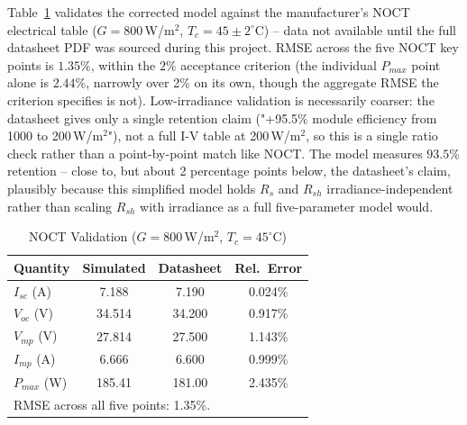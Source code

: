Table~\ref{tab:noct-validation} validates the corrected model against the
manufacturer's NOCT electrical table ($G=800\,$W/m$^2$, $T_c=45\pm2^\circ$C)
-- data not available until the full datasheet PDF was sourced during this
project. RMSE across the five NOCT key points is $1.35\%$, within the $2\%$
acceptance criterion (the individual $P_{max}$ point alone is $2.44\%$,
narrowly over 2\% on its own, though the aggregate RMSE the criterion
specifies is not). Low-irradiance validation is necessarily coarser: the
datasheet gives only a single retention claim ("+95.5\% module efficiency
from 1000 to 200\,W/m$^2$"), not a full I-V table at 200\,W/m$^2$, so this
is a single ratio check rather than a point-by-point match like NOCT. The
model measures $93.5\%$ retention -- close to, but about 2 percentage
points below, the datasheet's claim, plausibly because this simplified
model holds $R_s$ and $R_{sh}$ irradiance-independent rather than scaling
$R_{sh}$ with irradiance as a full five-parameter model would.

\begin{table}[htbp]
\centering
\caption{NOCT Validation ($G=800$\,W/m$^2$, $T_c=45^\circ$C)}
\label{tab:noct-validation}
\begin{tabular}{@{}lccc@{}}
\toprule
Quantity & Simulated & Datasheet & Rel.\ Error \\
\midrule
$I_{sc}$ (A)  & 7.188  & 7.190  & 0.024\% \\
$V_{oc}$ (V)  & 34.514 & 34.200 & 0.917\% \\
$V_{mp}$ (V)  & 27.814 & 27.500 & 1.143\% \\
$I_{mp}$ (A)  & 6.666  & 6.600  & 0.999\% \\
$P_{max}$ (W) & 185.41 & 181.00 & 2.435\% \\
\bottomrule
\multicolumn{4}{l}{\footnotesize RMSE across all five points: 1.35\%.}
\end{tabular}
\end{table}
